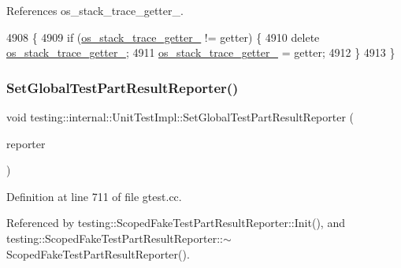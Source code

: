References os\+\_\+stack\+\_\+trace\+\_\+getter\+\_\+.


\begin{DoxyCode}
4908                                          \{
4909   \textcolor{keywordflow}{if} (\hyperlink{classtesting_1_1internal_1_1UnitTestImpl_a16b34d9194ca9552f581e472e9b18494}{os\_stack\_trace\_getter\_} != getter) \{
4910     \textcolor{keyword}{delete} \hyperlink{classtesting_1_1internal_1_1UnitTestImpl_a16b34d9194ca9552f581e472e9b18494}{os\_stack\_trace\_getter\_};
4911     \hyperlink{classtesting_1_1internal_1_1UnitTestImpl_a16b34d9194ca9552f581e472e9b18494}{os\_stack\_trace\_getter\_} = getter;
4912   \}
4913 \}
\end{DoxyCode}
\mbox{\label{classtesting_1_1internal_1_1UnitTestImpl_a892b0e25b28af5e4400cf6fac336f2d8}} 
\subsubsection{\texorpdfstring{Set\+Global\+Test\+Part\+Result\+Reporter()}{SetGlobalTestPartResultReporter()}}
{\footnotesize\ttfamily void testing\+::internal\+::\+Unit\+Test\+Impl\+::\+Set\+Global\+Test\+Part\+Result\+Reporter (\begin{DoxyParamCaption}\item[{\hyperlink{classtesting_1_1TestPartResultReporterInterface}{Test\+Part\+Result\+Reporter\+Interface} $\ast$}]{reporter }\end{DoxyParamCaption})}



Definition at line 711 of file gtest.\+cc.



Referenced by testing\+::\+Scoped\+Fake\+Test\+Part\+Result\+Reporter\+::\+Init(), and testing\+::\+Scoped\+Fake\+Test\+Part\+Result\+Reporter\+::$\sim$\+Scoped\+Fake\+Test\+Part\+Result\+Reporter().


